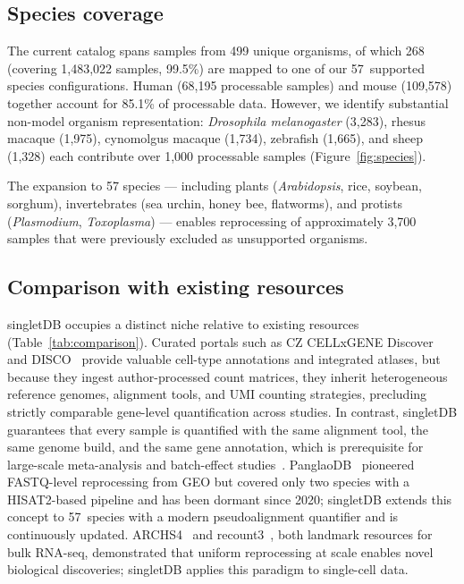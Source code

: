 \documentclass[10pt,twocolumn,letterpaper]{article}
\begin{document}
\subsection{Species coverage}

The current catalog spans samples from 499 unique organisms, of which 268
(covering 1,483,022 samples, 99.5\%) are mapped to one of our 57~supported
species configurations. Human (68,195 processable samples) and mouse
(109,578) together account for 85.1\% of processable data. However, we
identify substantial non-model organism representation: \textit{Drosophila
melanogaster} (3,283), rhesus macaque (1,975), cynomolgus macaque (1,734),
zebrafish (1,665), and sheep (1,328) each contribute over 1,000
processable samples (Figure~\ref{fig:species}).

The expansion to 57 species — including plants (\textit{Arabidopsis},
rice, soybean, sorghum), invertebrates (sea urchin, honey bee, flatworms),
and protists (\textit{Plasmodium}, \textit{Toxoplasma}) — enables
reprocessing of approximately 3,700 samples that were previously excluded
as unsupported organisms.

\subsection{Comparison with existing resources}

singletDB occupies a distinct niche relative to existing resources
(Table~\ref{tab:comparison}). Curated portals such as CZ
CELLxGENE Discover~\citep{cellxgene2023} and DISCO~\citep{li2022disco}
provide valuable cell-type annotations and integrated atlases, but because
they ingest author-processed count matrices, they inherit heterogeneous
reference genomes, alignment tools, and UMI counting strategies, precluding
strictly comparable gene-level quantification across studies. In contrast,
singletDB guarantees that every sample is quantified with the same
alignment tool, the same genome build, and the same gene annotation, which
is prerequisite for large-scale meta-analysis and batch-effect
studies~\citep{luecken2022}. PanglaoDB~\citep{franzen2019} pioneered FASTQ-level
reprocessing from GEO but covered only two species with a HISAT2-based
pipeline and has been dormant since 2020; singletDB extends this concept to
57~species with a modern pseudoalignment quantifier and is continuously
updated. ARCHS4~\citep{lachmann2018} and
recount3~\citep{wilks2021recount3}, both landmark resources for bulk
RNA-seq, demonstrated that uniform reprocessing at scale enables novel
biological discoveries; singletDB applies this paradigm to single-cell
data.
\end{document}
